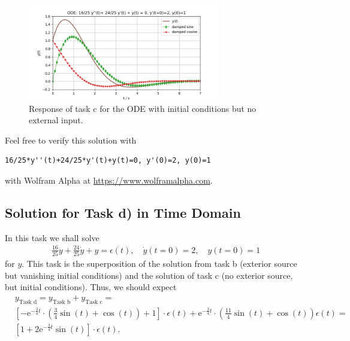 \documentclass[a4paper,11pt,oneside]{scrartcl}
\begin{document}
\begin{figure}[h!]
\centering
\includegraphics[width=0.75\textwidth]{initial_conditions_response_parts}
\caption{Response of task c for the ODE with initial conditions but no external input.}
\label{fig:initial_conditions_response_parts}
\end{figure}

Feel free to verify this solution with
\begin{verbatim}
16/25*y''(t)+24/25*y'(t)+y(t)=0, y'(0)=2, y(0)=1
\end{verbatim}
with Wolfram Alpha at \url{https://www.wolframalpha.com}.


\subsection{Solution for Task d) in Time Domain}
In this task we shall solve
\begin{align}
\frac{16}{25} \ddot{y} + \frac{24}{25} \dot{y} + y = \epsilon(t), \quad
\dot{y}(t=0) = 2,\quad y(t=0)=1
\end{align}
for $y$.
%
This task is the superposition of the solution from task b (exterior source
but vanishing initial conditions) and the solution of task c (no exterior
source, but initial conditions). Thus, we should expect
\begin{align}
&y_\text{Task d} =
y_\text{Task b} +
y_\text{Task c} =\nonumber\\
&[- \mathrm{e}^{-\frac{3}{4} t} \cdot
\left( \frac{3}{4} \sin(t) + \cos(t)\right) + 1] \cdot \epsilon(t)
+\mathrm{e}^{-\frac{3}{4} t} \cdot
\left( \frac{11}{4} \sin(t) + \cos(t)\right)\epsilon(t)=\nonumber\\
&[1 + 2\mathrm{e}^{-\frac{3}{4} t} \sin(t)] \cdot \epsilon(t).
\end{align}
\end{document}
